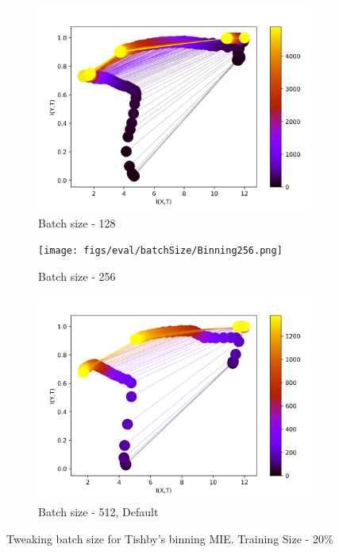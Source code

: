 \documentclass[dissertation.tex]{subfiles}
\begin{document}
\begin{figure}[ht]
  \begin{subfigure}[t]{0.3332\textwidth}
    \centering
    \includegraphics[width=\textwidth]{figs/eval/batchSize/Binning128.png}
    \caption{
      Batch size - 128
    }
    \label{figBatchSize128}
  \end{subfigure}
  \centering
  \begin{subfigure}[t]{0.3\textwidth}
    \centering
    \texttt{[image: figs/eval/batchSize/Binning256.png]}
    \caption{
      Batch size - 256
    }
    \label{figBatchSize256}
  \end{subfigure}
  \begin{subfigure}[t]{0.3332\textwidth}
    \centering
    \includegraphics[width=\textwidth]{figs/eval/batchSize/Binning512.png}
    \caption{
      Batch size - 512, Default
    }
    \label{figBatchSize512}
  \end{subfigure}
  \caption{
      Tweaking batch size for Tishby's binning MIE. Training Size - 20\%
    }
  \label{figBatchSize}
\end{figure}
\end{document}
